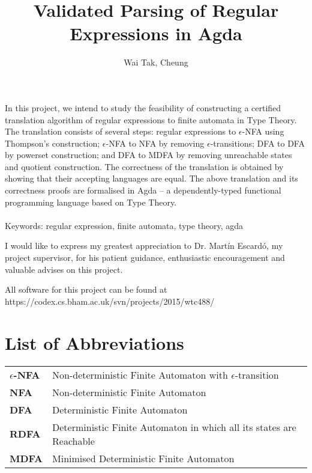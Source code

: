 \documentclass[twoside,openright,final]{bhamthesis}
\title{\textbf{Validated Parsing of Regular Expressions in Agda}}
\author{Wai Tak, Cheung}
\begin{document}
\maketitle


\abstract
\par In this project, we intend to study the feasibility of
constructing a certified translation algorithm of regular expressions to finite automata in Type
Theory. The translation consists of several steps: regular expressions
to \(\epsilon\)-NFA using Thompson's
construction; \(\epsilon\)-NFA to NFA by removing
\(\epsilon\)-transitions; DFA to DFA by powerset construction; and DFA
to MDFA by removing unreachable states and quotient construction. The
correctness of the translation is obtained by
showing that their accepting languages are equal. The above
translation and its correctness proofs are formalised in Agda -- a
dependently-typed functional programming language based on Type Theory. 
\\ \\
Keywords: regular expression, finite automata, type theory, agda

\acknowledgments
\par I would like to express my greatest appreciation to Dr. Martín
Escardó, my project supervisor, for his patient guidance, enthusiastic
encouragement and valuable advises on this project. 

\repository
\vspace{7cm}
\begin{center}
  All software for this project can be found at \\
  https://codex.cs.bham.ac.uk/svn/projects/2015/wtc488/
\end{center}

\chapter*{List of Abbreviations}
\let\cleardoublepage\clearpage
\begin{tabular}{ll}
  \textbf{\(\epsilon\)-NFA} & Non-deterministic Finite Automaton with
                              \(\epsilon\)-transition \\
  \textbf{NFA} & Non-deterministic Finite Automaton \\
  \textbf{DFA} & Deterministic Finite Automaton \\
  \textbf{RDFA} & Deterministic Finite Automaton in which all its states are
                  Reachable \\
  \textbf{MDFA} & Minimised Deterministic Finite Automaton
\end{tabular}
\end{document}
